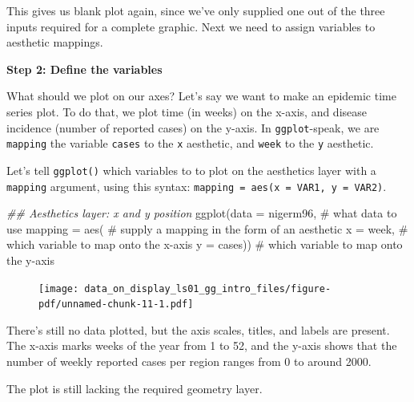 \documentclass[
  letterpaper,
  DIV=11,
  numbers=noendperiod]{scrreprt}
\newenvironment{Shaded}{\begin{snugshade}}{\end{snugshade}}
\newcommand{\AttributeTok}[1]{\textcolor[rgb]{0.40,0.45,0.13}{#1}}
\newcommand{\CommentTok}[1]{\textcolor[rgb]{0.37,0.37,0.37}{#1}}
\newcommand{\DocumentationTok}[1]{\textcolor[rgb]{0.37,0.37,0.37}{\textit{#1}}}
\newcommand{\FunctionTok}[1]{\textcolor[rgb]{0.28,0.35,0.67}{#1}}
\newcommand{\NormalTok}[1]{\textcolor[rgb]{0.00,0.23,0.31}{#1}}
\begin{document}
This gives us blank plot again, since we've only supplied one out of the
three inputs required for a complete graphic. Next we need to assign
variables to aesthetic mappings.

\textbf{Step 2: Define the variables}

What should we plot on our axes? Let's say we want to make an epidemic
time series plot. To do that, we plot time (in weeks) on the x-axis, and
disease incidence (number of reported cases) on the y-axis. In
\texttt{ggplot}-speak, we are \texttt{mapping} the variable
\texttt{cases} to the \texttt{x} aesthetic, and \texttt{week} to the
\texttt{y} aesthetic.

Let's tell \texttt{ggplot()} which variables to to plot on the
aesthetics layer with a \texttt{mapping} argument, using this syntax:
\texttt{mapping\ =\ aes(x\ =\ VAR1,\ y\ =\ VAR2)}.

\begin{Shaded}
\begin{Highlighting}[]
\DocumentationTok{\#\# Aesthetics layer: x and y position}
\FunctionTok{ggplot}\NormalTok{(}\AttributeTok{data =}\NormalTok{ nigerm96, }\CommentTok{\# what data to use}
       \AttributeTok{mapping =} \FunctionTok{aes}\NormalTok{(   }\CommentTok{\# supply a mapping in the form of an \textquotesingle{}aesthetic\textquotesingle{}}
         \AttributeTok{x =}\NormalTok{ week,      }\CommentTok{\# which variable to map onto the x{-}axis}
         \AttributeTok{y =}\NormalTok{ cases))    }\CommentTok{\# which variable to map onto the y{-}axis}
\end{Highlighting}
\end{Shaded}

\begin{figure}[H]

{\centering \texttt{[image: data\_on\_display\_ls01\_gg\_intro\_files/figure-pdf/unnamed-chunk-11-1.pdf]}

}

\end{figure}

There's still no data plotted, but the axis scales, titles, and labels
are present. The x-axis marks weeks of the year from 1 to 52, and the
y-axis shows that the number of weekly reported cases per region ranges
from 0 to around 2000.

The plot is still lacking the required geometry layer.
\end{document}

